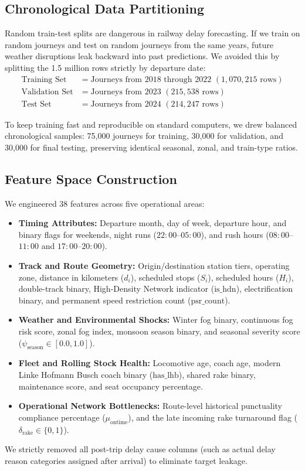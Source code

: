 \documentclass[11pt,a4paper]{article}
\begin{document}
\subsection{Chronological Data Partitioning}
Random train-test splits are dangerous in railway delay forecasting. If we train on random journeys and test on random journeys from the same years, future weather disruptions leak backward into past predictions. We avoided this by splitting the 1.5 million rows strictly by departure date:
\begin{align}
\text{Training Set}   &= \text{Journeys from 2018 through 2022 } (1,070,215\text{ rows}) \\
\text{Validation Set} &= \text{Journeys from 2023 } (215,538\text{ rows}) \\
\text{Test Set}       &= \text{Journeys from 2024 } (214,247\text{ rows})
\end{align}

To keep training fast and reproducible on standard computers, we drew balanced chronological samples: 75,000 journeys for training, 30,000 for validation, and 30,000 for final testing, preserving identical seasonal, zonal, and train-type ratios.

\subsection{Feature Space Construction}
We engineered 38 features across five operational areas:
\begin{itemize}[leftmargin=1.5em]
    \item \textbf{Timing Attributes:} Departure month, day of week, departure hour, and binary flags for weekends, night runs ($22:00$--$05:00$), and rush hours ($08:00$--$11:00$ and $17:00$--$20:00$).
    \item \textbf{Track and Route Geometry:} Origin/destination station tiers, operating zone, distance in kilometers ($d_i$), scheduled stops ($S_i$), scheduled hours ($H_i$), double-track binary, High-Density Network indicator ($\mathrm{is\_hdn}$), electrification binary, and permanent speed restriction count ($\mathrm{psr\_count}$).
    \item \textbf{Weather and Environmental Shocks:} Winter fog binary, continuous fog risk score, zonal fog index, monsoon season binary, and seasonal severity score ($\psi_{\mathrm{season}} \in [0.0, 1.0]$).
    \item \textbf{Fleet and Rolling Stock Health:} Locomotive age, coach age, modern Linke Hofmann Busch coach binary ($\mathrm{has\_lhb}$), shared rake binary, maintenance score, and seat occupancy percentage.
    \item \textbf{Operational Network Bottlenecks:} Route-level historical punctuality compliance percentage ($\mu_{\mathrm{ontime}}$), and the late incoming rake turnaround flag ($\delta_{\mathrm{rake}} \in \{0, 1\}$).
\end{itemize}
We strictly removed all post-trip delay cause columns (such as actual delay reason categories assigned after arrival) to eliminate target leakage.
\end{document}
